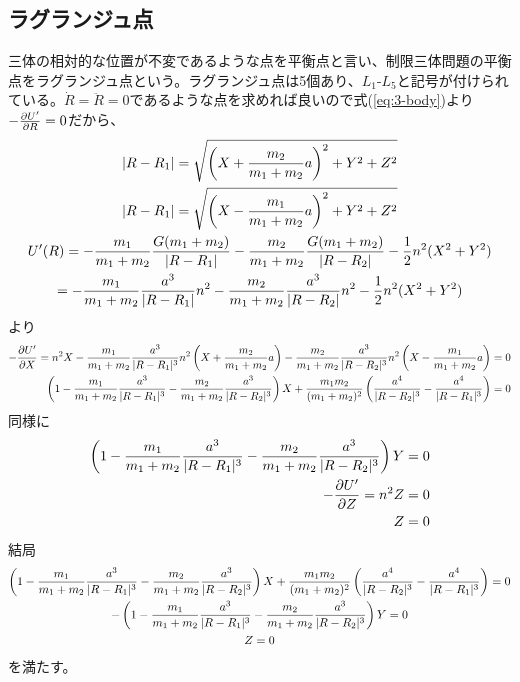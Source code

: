 
	\subsection{ラグランジュ点}
		三体の相対的な位置が不変であるような点を平衡点と言い、制限三体問題の平衡点をラグランジュ点という。ラグランジュ点は5個あり、$L_1$-$L_5$と記号が付けられている。$\dot{R} = \ddot{R} = 0$であるような点を求めれば良いので式(\ref{eq:3-body})より$- \pd[U']{R} = 0$だから、
		\begin{gather*}
			|R - R_1| = \sqrt{\lr{X + \frac{m_2}{m_1 + m_2}a}^2 + Y^2 + Z^2}\\
			|R - R_1| = \sqrt{\lr{X - \frac{m_1}{m_1 + m_2}a}^2 + Y^2 + Z^2}\\
			U'(R) = - \frac{m_1}{m_1 + m_2}\frac{G(m_1 + m_2)}{|R - R_1|} - \frac{m_2}{m_1 + m_2}\frac{G(m_1 + m_2)}{|R - R_2|} - \frac{1}{2}n^2(X^2 + Y^2)\\
			= - \frac{m_1}{m_1 + m_2}\frac{a^3}{|R - R_1|}n^2 - \frac{m_2}{m_1 + m_2}\frac{a^3}{|R - R_2|}n^2 - \frac{1}{2}n^2(X^2 + Y^2)
		\end{gather*}
        より
		\begin{align*}
			- \pd[U']{X} = n^2 X - \frac{m_1}{m_1 + m_2}\frac{a^3}{|R - R_1|^3}n^2\lr{X + \frac{m_2}{m_1 + m_2}a} - \frac{m_2}{m_1 + m_2}\frac{a^3}{|R - R_2|^3}n^2\lr{X - \frac{m_1}{m_1 + m_2}a} = 0\\
			\lr{ 1 - \frac{m_1}{m_1 + m_2}\frac{a^3}{|R - R_1|^3} - \frac{m_2}{m_1 + m_2}\frac{a^3}{|R - R_2|^3} }X + \frac{m_1m_2}{(m_1 + m_2)^2}\lr{\frac{a^4}{|R - R_2|^3} - \frac{a^4}{|R - R_1|^3}} = 0\\
		\end{align*}
		同様に
		\begin{align*}
			\lr{ 1 - \frac{m_1}{m_1 + m_2}\frac{a^3}{|R - R_1|^3} - \frac{m_2}{m_1 + m_2}\frac{a^3}{|R - R_2|^3} }Y = 0\\
			- \pd[U']{Z} = n^2 Z = 0\\
			Z = 0
		\end{align*}
		結局
		\begin{gather*}
			\lr{ 1 - \frac{m_1}{m_1 + m_2}\frac{a^3}{|R - R_1|^3} - \frac{m_2}{m_1 + m_2}\frac{a^3}{|R - R_2|^3} }X + \frac{m_1m_2}{(m_1 + m_2)^2}\lr{\frac{a^4}{|R - R_2|^3} - \frac{a^4}{|R - R_1|^3}} = 0\\
			-\lr{ 1 - \frac{m_1}{m_1 + m_2}\frac{a^3}{|R - R_1|^3} - \frac{m_2}{m_1 + m_2}\frac{a^3}{|R - R_2|^3} }Y = 0\\
			Z = 0\\
		\end{gather*}
		を満たす。

